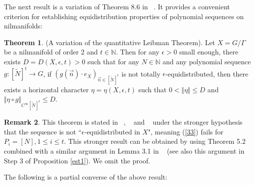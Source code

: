 \documentclass[12pt,amstex]{amsart}
\theoremstyle{definition}
\newtheorem{thm}{Theorem}[section]
\newtheorem{rem}[thm]{Remark}
\def \e {\epsilon}
\begin{document}
The next result is a variation of Theorem 8.6 in ~\cite{GT}. It provides a convenient criterion for establishing equidistribution properties
of polynomial sequences on nilmanifolds:

\begin{thm}\label{Lei}(A variation of the quantitative Leibman Theorem).
  Let $X=G/\Gamma$ be a nilmanifold of order 2 and $t\in\mathbb{N}$. Then for any $\e>0$ small enough, there exists $D=D(X,\e,t)>0$ such that for any $N\in\mathbb{N}$ and any polynomial sequence $g\colon [\tilde{N}]^{t}\rightarrow G$, if $(g(\vec{n})\cdot e_{X})_{\vec{n}\in[\tilde{N}]^{t}}$ is not totally $\e$-equidistributed, then there exists a horizontal character $\eta=\eta(X,\e,t)$ such that $0<\Vert\eta\Vert\leq D$ and $\Vert \eta\circ g\Vert_{C^{\infty}[\tilde{N}]^{t}}\leq D$.
\end{thm}

\begin{rem}
This theorem is stated in ~\cite{er}, ~\cite{er2} and ~\cite{GT} under the stronger hypothesis that the sequence is not ``$\e$-equidistributed in $X$", meaning (\ref{33}) fails for $P_{i}=[N],1\leq i\leq t$.
This stronger result can be obtained by using Theorem 5.2 ~\cite{FH} combined with a similar argument in Lemma 3.1 in ~\cite{er2} (see also this argument in Step 3 of Proposition \ref{est1}). We omit the proof. 
\end{rem}

The following is a partial converse of the above result:
\end{document}

